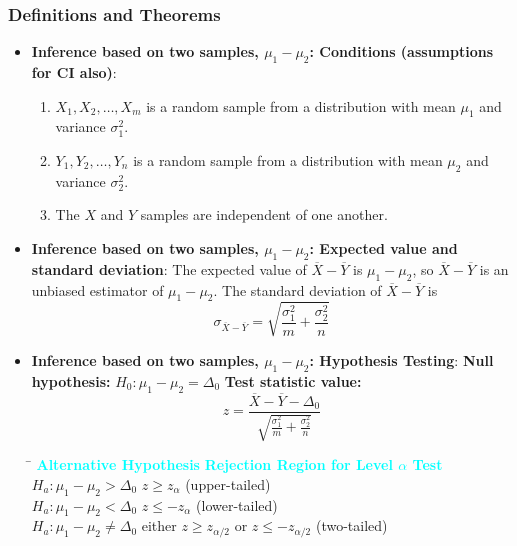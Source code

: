 \documentclass{report}
\begin{document}
    \subsubsection{Definitions and Theorems}
    \begin{itemize}
        
    \item \textbf{Inference based on two samples, $\mu_{1} - \mu_{2}$: Conditions (assumptions for CI also)}:
    \begin{enumerate}
        \item $X_1, X_2, \ldots, X_m$ is a random sample from a distribution with mean $\mu_1$ and variance $\sigma_1^2$.
        \item $Y_1, Y_2, \ldots, Y_n$ is a random sample from a distribution with mean $\mu_2$ and variance $\sigma_2^2$.
        \item The $X$ and $Y$ samples are independent of one another.
    \end{enumerate}
    \item \textbf{Inference based on two samples, $\mu_{1} - \mu_{2}$: Expected value and standard deviation}:
        The expected value of $\overline{X} - \overline{Y}$ is $\mu_1 - \mu_2$, so $\overline{X} - \overline{Y}$ is an unbiased estimator of $\mu_1 - \mu_2$. The standard deviation of $\overline{X} - \overline{Y}$ is
        \[
            \sigma_{\overline{X} - \overline{Y}} = \sqrt{\frac{\sigma_1^2}{m} + \frac{\sigma_2^2}{n}}
        \]
    \item \textbf{Inference based on two samples, $\mu_{1}- \mu_{2}$: Hypothesis Testing}:
        \textbf{Null hypothesis:} $H_0: \mu_1 - \mu_2 = \Delta_0$
        \bigbreak \noindent 
        \textbf{Test statistic value:}
        \[
            z = \frac{\overline{X} - \overline{Y} - \Delta_0}{\sqrt{\frac{\sigma_1^2}{m} + \frac{\sigma_2^2}{n}}}
        \]
        \begin{tabbing}
            \hspace{3cm} \= \kill
            \textcolor{cyan}{\textbf{Alternative Hypothesis}} \> \textcolor{cyan}{\textbf{Rejection Region for Level $\alpha$ Test}} \\
            $H_a: \mu_1 - \mu_2 > \Delta_0$ \> $z \ge z_\alpha$ (upper-tailed) \\
            $H_a: \mu_1 - \mu_2 < \Delta_0$ \> $z \le -z_\alpha$ (lower-tailed) \\
            $H_a: \mu_1 - \mu_2 \neq \Delta_0$ \> either $z \ge z_{\alpha/2}$ or $z \le -z_{\alpha/2}$ (two-tailed) \\

\end{tabbing}
\end{itemize}
\end{document}
